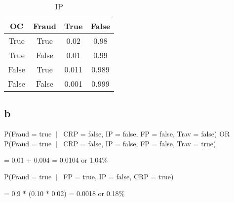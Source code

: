 \documentclass{article}
\begin{document}
	\begin{table}[h!]
		\begin{center}
			\caption{IP}
				\begin{tabular}{c|c|c|c}
				\textbf{OC} & \textbf{Fraud} & \textbf{True} & \textbf{False}\\
				\hline
				True & True & 0.02 & 0.98\\
				True & False & 0.01 & 0.99\\
				False & True & 0.011 & 0.989\\
				False & False & 0.001 & 0.999\\
				\end{tabular}
		\end{center}
	\end{table}

\subsection*{b}
	P(Fraud = true $\|$ CRP = false, IP = false, FP = false, Trav = false) OR 
	\newline P(Fraud = true $\|$ CRP = false, IP = false, FP = false, Trav = true)
	
	= 0.01 + 0.004 = 0.0104 or 1.04$\%$ \newline

	P(Fraud = true $\|$ FP = true, IP = false, CRP = true)

	= 0.9 * (0.10 * 0.02) = 0.0018 or 0.18$\%$
	
\end{document}
